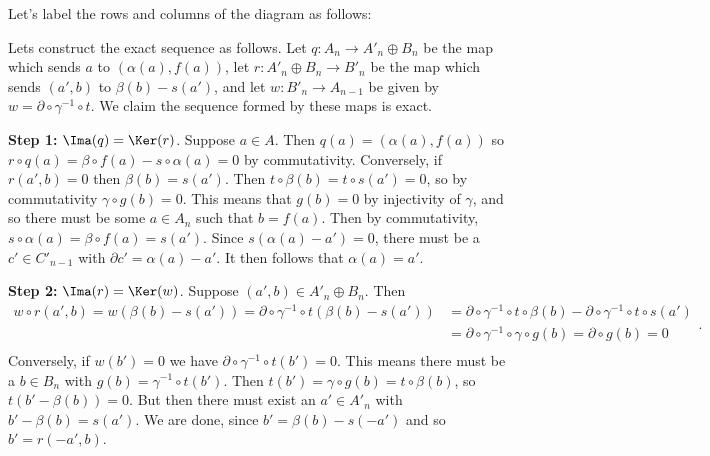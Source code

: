 \documentclass[11pt,letterpaper]{article}
\begin{document}
\begin{solution}
    Let's label the rows and columns of the diagram as follows:
    \begin{center}
    \end{center}
    Lets construct the exact sequence as follows. Let $q : A_n \to A'_n\oplus B_n$ be the map which sends $a$ to $(\alpha(a), f(a))$, let $r : A'_n\oplus B_n \to B'_n$ be the map which sends $(a',b)$ to $\beta(b)-s  (a')$, and let $w : B'_n \to A_{n-1}$ be given by $w = \partial\circ \gamma^{-1} \circ t$. We claim the sequence formed by these maps is exact.
    
    \textbf{Step 1:} $\Ima(q) = \Ker(r)$. Suppose $a\in A$. Then $q(a)=(\alpha(a),f(a))$ so $r\circ q(a)=\beta\circ f(a)-s\circ\alpha(a)=0$ by commutativity. Conversely, if $r(a',b)=0$ then $\beta(b)=s(a')$. Then $t\circ \beta(b)=t\circ s(a')=0$, so by commutativity $\gamma\circ g(b)=0$. This means that $g(b)=0$ by injectivity of $\gamma$, and so there must be some $a\in A_n$ such that $b=f(a)$. Then by commutativity, $s\circ\alpha(a)=\beta\circ f(a)=s(a')$. Since $s(\alpha(a)-a')=0$, there must be a $c'\in C'_{n-1}$ with $\partial c' = \alpha(a)-a'$. It then follows that $\alpha(a)=a'$.
    
    \textbf{Step 2:} $\Ima(r) = \Ker(w)$. Suppose $(a',b)\in A'_n\oplus B_n$. Then 
    \[
        \begin{aligned}
            w\circ r(a',b)=w(\beta(b)-s(a'))=\partial\circ\gamma^{-1}\circ t(\beta(b)-s(a'))&=\partial\circ\gamma^{-1}\circ t\circ \beta(b) - \partial\circ\gamma^{-1}\circ t\circ s(a')\\
            &=\partial\circ\gamma^{-1}\circ \gamma \circ g(b)=\partial\circ g(b)=0\\ 
        \end{aligned}
    .\] 
    Conversely, if $w(b')=0$ we have $\partial\circ \gamma^{-1}\circ t(b')=0$. This means there must be a $b\in B_n$ with $g(b)=\gamma^{-1}\circ t(b')$. Then $t(b')=\gamma\circ g(b)=t\circ\beta(b)$, so $t(b'-\beta(b))=0$. But then there must exist an $a'\in A'_n$ with $b'-\beta(b)=s(a')$. We are done, since $b'=\beta(b)-s(-a')$ and so $b'=r(-a',b)$.


\end{solution}
\end{document}
